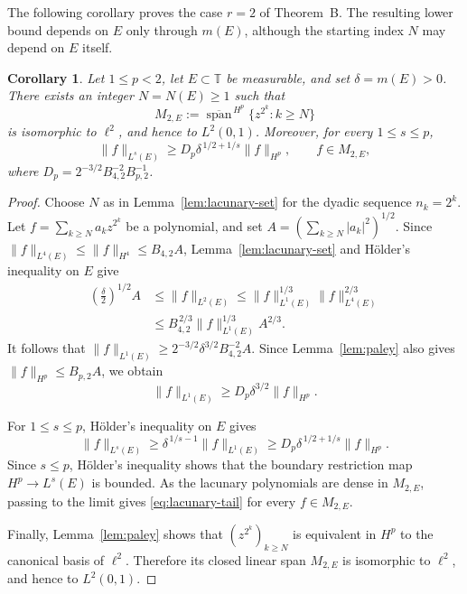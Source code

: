 \documentclass[11pt, reqno]{amsart}
\newtheorem{corollary}[theorem]{Corollary}
\theoremstyle{definition}
\theoremstyle{remark}
\newcommand{\T}{\mathbb{T}}
\begin{document}
The following corollary proves the case \(r=2\) of Theorem~B. The
resulting lower bound depends on \(E\) only through \(m(E)\), although
the starting index \(N\) may depend on \(E\) itself.

\begin{corollary}
\label{cor:lacunary-tail}
Let \(1\le p<2\), let \(E\subset\T\) be measurable, and set
\(\delta=m(E)>0\). There exists an integer \(N=N(E)\ge1\) such that
\[
        M_{2,E}
        :=
        \overline{\operatorname{span}}^{\,H^p}
        \{z^{2^k}:k\ge N\}
\]
is isomorphic to \(\ell^2\), and hence to \(L^2(0,1)\). Moreover,
for every \(1\le s\le p\),
\begin{equation}
\label{eq:lacunary-tail}
        \|f\|_{L^s(E)}
        \ge
        D_p\delta^{\,1/2+1/s}\|f\|_{H^p},
        \qquad
        f\in M_{2,E},
\end{equation}
where
\(D_p=2^{-3/2}B_{4,2}^{-2}B_{p,2}^{-1}\).
\end{corollary}

\begin{proof}
Choose \(N\) as in Lemma~\ref{lem:lacunary-set} for the
dyadic sequence \(n_k=2^k\). Let
\(f=\sum\limits_{k\ge N}a_kz^{2^k}\) be a polynomial, and set
\(A=(\sum\limits_{k\ge N}|a_k|^2)^{1/2}\). Since
\(\|f\|_{L^4(E)}\le\|f\|_{H^4}\le B_{4,2}A\),
Lemma~\ref{lem:lacunary-set} and H\"older's inequality on \(E\)
give
\[
\begin{aligned}
        \left(\frac{\delta}{2}\right)^{1/2}A
        &\le
        \|f\|_{L^2(E)}
        \le
        \|f\|_{L^1(E)}^{1/3}\|f\|_{L^4(E)}^{2/3} \\
        &\le
        B_{4,2}^{\,2/3}\|f\|_{L^1(E)}^{1/3}A^{2/3}.
\end{aligned}
\]
It follows that
\(\|f\|_{L^1(E)}
\ge2^{-3/2}\delta^{3/2}B_{4,2}^{-2}A\).
Since Lemma~\ref{lem:paley} also gives
\(\|f\|_{H^p}\le B_{p,2}A\), we obtain
\[
        \|f\|_{L^1(E)}
        \ge
        D_p\delta^{3/2}\|f\|_{H^p}.
\]

For \(1\le s\le p\), H\"older's inequality on \(E\) gives
\[
        \|f\|_{L^s(E)}
        \ge
        \delta^{\,1/s-1}\|f\|_{L^1(E)}
        \ge
        D_p\delta^{\,1/2+1/s}\|f\|_{H^p}.
\]
Since \(s\le p\), H\"older's inequality shows that the boundary
restriction map \(H^p\to L^s(E)\) is bounded. As the lacunary
polynomials are dense in \(M_{2,E}\), passing to the limit gives
\eqref{eq:lacunary-tail} for every \(f\in M_{2,E}\).

Finally, Lemma~\ref{lem:paley} shows that
\((z^{2^k})_{k\ge N}\) is equivalent in \(H^p\) to the canonical basis
of \(\ell^2\). Therefore its closed linear span \(M_{2,E}\) is
isomorphic to \(\ell^2\), and hence to \(L^2(0,1)\).
\end{proof}
\end{document}
